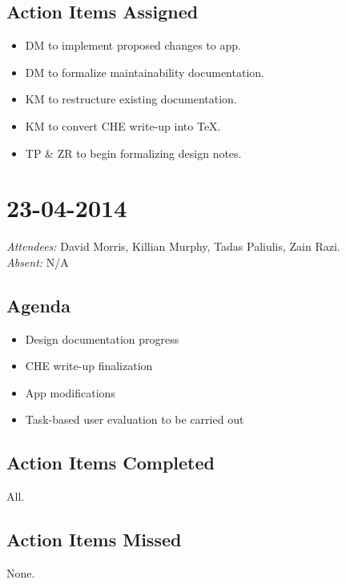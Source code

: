 \documentclass{article}
\begin{document}
\subsection*{Action Items Assigned}
\begin{itemize}
\item DM to implement proposed changes to app.
\item DM to formalize maintainability documentation.
\item KM to restructure existing documentation.
\item KM to convert CHE write-up into TeX.
\item TP \& ZR to begin formalizing design notes.
\end{itemize}


\clearpage

\section*{23-04-2014}
\vspace{0.5cm}
\emph{Attendees: }David Morris, Killian Murphy, Tadas Paliulis, Zain Razi.
\\
\emph{Absent: }N/A

\subsection*{Agenda}
\begin{itemize}
\item Design documentation progress
\item CHE write-up finalization
\item App modifications
\item Task-based user evaluation to be carried out
\end{itemize}

\subsection*{Action Items Completed}
All.

\subsection*{Action Items Missed}
None.
\end{document}
